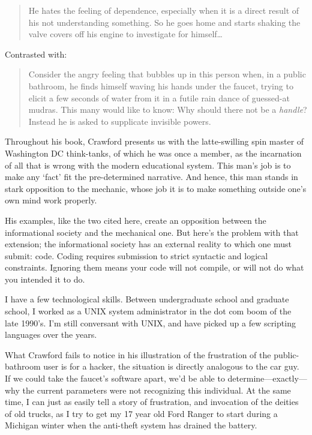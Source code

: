 \begin{quote}

He hates the feeling of dependence, especially when it is a direct result of his not understanding something. So he goes home and starts shaking the valve covers off his engine to investigate for himself{\ldots} ~\citep[P. 54]{Crawford:2009tz}
\end{quote}

Contrasted with:

\begin{quote}

Consider the angry feeling that bubbles up in this person when, in a public bathroom, he finds himself waving his hands under the faucet, trying to elicit a few seconds of water from it in a futile rain dance of guessed-at mudras. This many would like to know: Why should there not be a \emph{handle}? Instead he is asked to supplicate invisible powers. ~\citep[p. 55--56]{Crawford:2009tz}
\end{quote}

Throughout his book, Crawford presents us with the latte-swilling spin master of Washington DC think-tanks, of which he was once a member, as the incarnation of all that is wrong with the modern educational system. This man's job is to make any `fact' fit the pre-determined narrative. And hence, this man stands in stark opposition to the mechanic, whose job it is to make something outside one's own mind work properly.

His examples, like the two cited here, create an opposition between the informational society and the mechanical one. But here's the problem with that extension; the informational society has an external reality to which one must submit: code. Coding requires submission to strict syntactic and logical constraints. Ignoring them means your code will not compile, or will not do what you intended it to do.

I have a few technological skills. Between undergraduate school and graduate school, I worked as a UNIX system administrator in the dot com boom of the late 1990's. I'm still conversant with UNIX, and have picked up a few scripting languages over the years. 

What Crawford fails to notice in his illustration of the frustration of the public-bathroom user is for a hacker, the situation is directly analogous to the car guy. If we could take the faucet's software apart, we'd be able to determine---exactly---why the current parameters were not recognizing this individual. At the same time, I can just as easily tell a story of frustration, and invocation of the deities of old trucks, as I try to get my 17 year old Ford Ranger to start during a Michigan winter when the anti-theft system has drained the battery.

